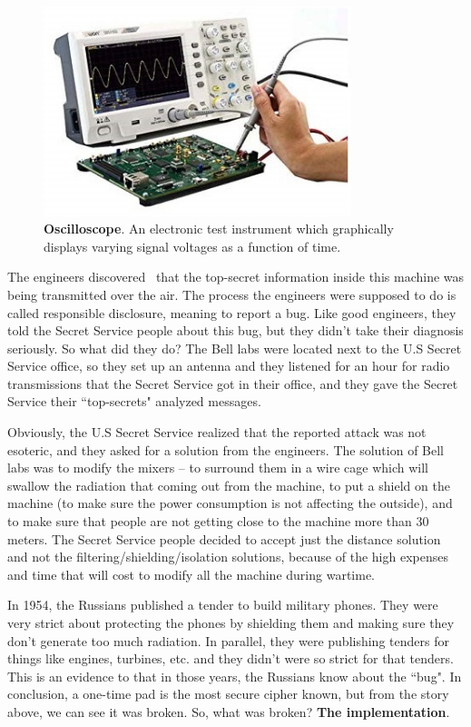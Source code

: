 \begin{figure}
    \centering
    \includegraphics[width=0.8\textwidth]{images/ch1_Intro/oscilloscope.jpg}
    \caption{\textbf{Oscilloscope}. An electronic test instrument which graphically displays varying signal voltages as a function of time.}
    \label{fig:Oscillo}
\end{figure}

The engineers discovered~\cite{NSAsecret} that the top-secret information inside
this machine was being transmitted over the air. The process the engineers were
supposed to do is called responsible disclosure, meaning to report a bug. Like
good engineers, they told the Secret Service people about this bug, but they
didn't take their diagnosis seriously. So what did they do? The Bell labs were
located next to the U.S Secret Service office, so they set up an antenna and
they listened for an hour for radio transmissions that the Secret Service got in
their office, and they gave the Secret Service their ``top-secrets" analyzed
messages.

Obviously, the U.S Secret Service realized that the reported attack was not
esoteric, and they asked for a solution from the engineers. The solution of Bell
labs was to modify the mixers – to surround them in a wire cage which will
swallow the radiation that coming out from the machine, to put a shield on the
machine (to make sure the power consumption is not affecting the outside), and
to make sure that people are not getting close to the machine more than 30
meters. The Secret Service people decided to accept just the distance solution
and not the filtering/shielding/isolation solutions, because of the high
expenses and time that will cost to modify all the machine during wartime.

In 1954, the Russians published a tender to build military phones. They were
very strict about protecting the phones by shielding them and making sure they
don't generate too much radiation. In parallel, they were publishing tenders for
things like engines, turbines, etc. and they didn't were so strict for that
tenders. This is an evidence to that in those years, the Russians know about the
``bug". In conclusion, a one-time pad is the most secure cipher known, but from
the story above, we can see it was broken. So, what was broken? \textbf{The
implementation}.

